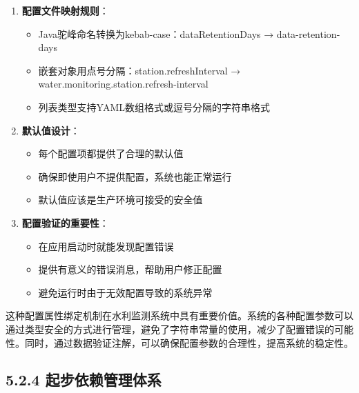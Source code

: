 \begin{enumerate}
\begin{itemize}
@NotEmpty\textbackslash code\{：非空验证 \item @Valid\textbackslash code\{：启用嵌套对象验证 \end{itemize} \item \textbf{配置文件映射规则}：
\begin{itemize} \tightlist \item Java驼峰命名转换为kebab-case：dataRetentionDays → data-retention-days \item
嵌套对象用点号分隔：station.refreshInterval → water.monitoring.station.refresh-interval \item 列表类型支持YAML数组格式或逗号分隔的字符串格式
\end{itemize} \item \textbf{默认值设计}： \begin{itemize} \tightlist \item 每个配置项都提供了合理的默认值 \item 确保即使用户不提供配置，系统也能正常运行 \item
默认值应该是生产环境可接受的安全值 \end{itemize} \item \textbf{配置验证的重要性}： \begin{itemize} \tightlist \item 在应用启动时就能发现配置错误 \item
提供有意义的错误消息，帮助用户修正配置 \item 避免运行时由于无效配置导致的系统异常 \end{itemize} \end{enumerate}
这种配置属性绑定机制在水利监测系统中具有重要价值。系统的各种配置参数可以通过类型安全的方式进行管理，避免了字符串常量的使用，减少了配置错误的可能性。同时，通过数据验证注解，可以确保配置参数的合理性，提高系统的稳定性。
\subsection{5.2.4 起步依赖管理体系}\label{ux8d77ux6b65ux4f9dux8d56ux7ba1ux7406ux4f53ux7cfb}
